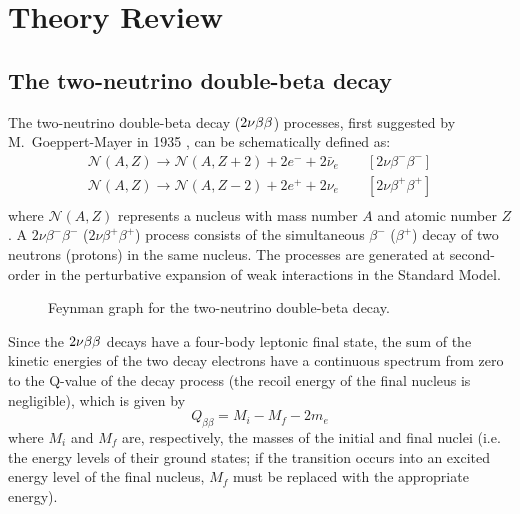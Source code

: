 \chapter{Theory Review}
\section*{The two-neutrino double-beta decay}
The two-neutrino double-beta decay ($2\nu\beta\beta$) processes, first suggested by M.~Goeppert-Mayer in 1935 \cite{PhysRev.48.512}, can be schematically defined as:
\begin{equation*}
	\begin{split}
		\mathcal{N}(A,Z)\longrightarrow \mathcal{N}(A,Z+2)+2e^-+2\bar{\nu}_e \qquad [2\nu\beta^-\beta^-] \\
		\mathcal{N}(A,Z)\longrightarrow \mathcal{N}(A,Z-2)+2e^++2\nu_e \qquad [2\nu\beta^+\beta^+]\\
	\end{split}
\end{equation*}
where $\mathcal{N}(A,Z)$ represents a nucleus with mass number $A$ and atomic number $Z$. A $2\nu\beta^-\beta^-$ ($2\nu\beta^+\beta^+$) process consists of the simultaneous $\beta^-$ ($\beta^+$) decay of two neutrons (protons) in the same nucleus. The processes are generated at second-order in the perturbative expansion of weak interactions in the Standard Model.
\begin{figure}
	\centering
	
	\caption{Feynman graph for the two-neutrino double-beta decay.}
	\label{fig:2nbbfey}
\end{figure}

Since the $2\nu\beta\beta$ decays have a four-body leptonic final state, the sum of the kinetic energies of the two decay electrons have a continuous spectrum from zero to the Q-value of the decay process (the recoil energy of the final nucleus is negligible), which is given by
\[Q_{\beta\beta}=M_i-M_f-2m_e\]
where $M_i$ and $M_f$ are, respectively, the masses of the initial and final nuclei (i.e. the energy levels of their ground states; if the transition occurs into an excited energy level of the final nucleus, $M_f$ must be replaced with the appropriate energy). 

